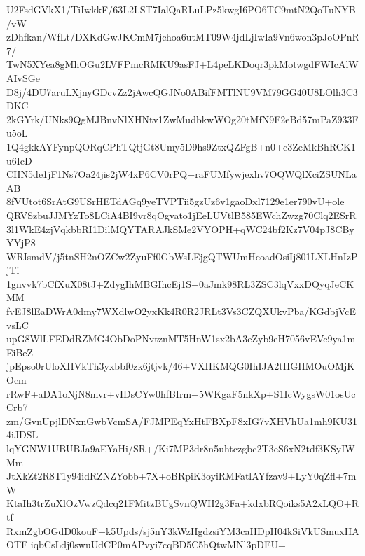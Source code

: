 U2FsdGVkX1/TiIwkkF/63L2LST7IalQaRLuLPz5kwgI6PO6TC9mtN2QoTuNYB/vW
zDhfkan/WfLt/DXKdGwJKCmM7jchoa6utMT09W4jdLjIwIa9Vn6won3pJoOPnR7/
TwN5XYea8gMhOGu2LVFPmcRMKU9asFJ+L4peLKDoqr3pkMotwgdFWIcAlWAIvSGe
D8j/4DU7aruLXjnyGDcvZz2jAwcQGJNo0ABifFMTlNU9VM79GG40U8LOlh3C3DKC
2kGYrk/UNks9QgMJBnvNlXHNtv1ZwMudbkwWOg20tMfN9F2eBd57mPaZ933Fu5oL
1Q4gkkAYFynpQORqCPhTQtjGt8Umy5D9hs9ZtxQZFgB+n0+c3ZeMkBhRCK1u6IcD
CHN5de1jF1Ns7Oa24jis2jW4xP6CV0rPQ+raFUMfywjexhv7OQWQlXciZSUNLaAB
8fVUtot6SrAtG9USrHETdAGq9yeTVPTii5gzUz6v1gaoDxl7129e1er790vU+ole
QRVSzbuJJMYzTo8LCiA4BI9vr8qOgvato1jEeLUVtlB585EWchZwzg70Clq2ESrR
3l1WkE4zjVqkbbRI1DilMQYTARAJkSMe2VYOPH+qWC24bf2Kz7V04pJ8CByYYjP8
WRIsmdV/j5tnSH2nOZCw2ZyuFf0GbWsLEjgQTWUmHcoadOsiIj801LXLHnIzPjTi
1gnvvk7bCfXuX08tJ+ZdygIhMBGIhcEj1S+0aJmk98RL3ZSC3lqVxxDQyqJeCKMM
fvEJ8lEaDWrA0dmy7WXdlwO2yxKk4R0R2JRLt3Vs3CZQXUkvPba/KGdbjVcEvsLC
upG8WlLFEDdRZMG4ObDoPNvtznMT5HnW1sx2bA3eZyb9eH7056vEVc9ya1mEiBeZ
jpEpso0rUloXHVkTh3yxbbf0zk6jtjvk/46+VXHKMQG0IhIJA2tHGHMOuOMjKOcm
rRwF+aDA1oNjN8mvr+vIDsCYw0hfBIrm+5WKgaF5nkXp+S1IcWygsW01osUcCrb7
zm/GvnUpjlDNxnGwbVcmSA/FJMPEqYxHtFBXpF8xIG7vXHVhUa1mh9KU314iJDSL
lqYGNW1UBUBJa9aEYaHi/SR+/Ki7MP3dr8n5uhtczgbc2T3eS6xN2tdf3KSyIWMm
JtXkZt2R8T1y94idRZNZYobb+7X+oBRpiK3oyiRMFatlAYfzav9+LyY0qZfl+7mW
KtaIh3trZuXlOzVwzQdcq21FMitzBUgSvnQWH2g3Fa+kdxbRQoiks5A2xLQO+Rtf
RxmZgbOGdD0kouF+k5Upds/sj5nY3kWzHgdzsiYM3caHDpH04kSiVkUSmuxHAOTF
iqbCsLdj0swuUdCP0mAPvyi7cqBD5C5hQtwMNl3pDEU=
